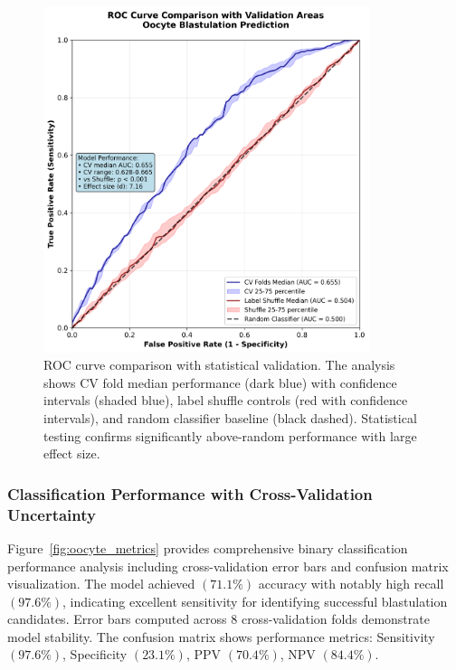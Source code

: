 \begin{figure}[H]
    \centering
    \includegraphics[width=0.85\textwidth]{figures/oocyte_roc_comparison.png}
    \caption{ROC curve comparison with statistical validation. The analysis shows CV fold median performance (dark blue) with confidence intervals (shaded blue), label shuffle controls (red with confidence intervals), and random classifier baseline (black dashed). Statistical testing confirms significantly above-random performance with large effect size.}
    \label{fig:oocyte_roc}
\end{figure}

\subsubsection{Classification Performance with Cross-Validation Uncertainty}

Figure~\ref{fig:oocyte_metrics} provides comprehensive binary classification performance analysis including cross-validation error bars and confusion matrix visualization. The model achieved $(71.1\%)$ accuracy with notably high recall $(97.6\%)$, indicating excellent sensitivity for identifying successful blastulation candidates. Error bars computed across 8 cross-validation folds demonstrate model stability. The confusion matrix shows performance metrics: Sensitivity $(97.6\%)$, Specificity $(23.1\%)$, PPV $(70.4\%)$, NPV $(84.4\%)$.

